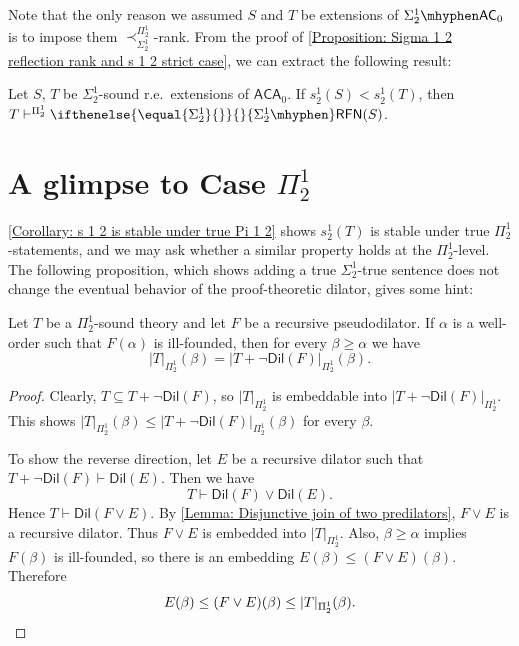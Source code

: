 \documentclass{mhkr}
\newcommand{\added}[1]{#1}
\newcommand{\Dil}{\mathsf{Dil}}
\newcommand{\RFN}[1][]{\ifthenelse{\equal{#1}{}}{}{#1\mhyphen}\mathsf{RFN}}
\newcommand{\AC}{\mathsf{AC}}
\newcommand{\ACA}{\mathsf{ACA}}
\begin{document}
Note that the only reason we assumed $S$ and $T$ be extensions of $\Sigma^1_2\mhyphen\AC_0$ is to impose them $\prec^{\Pi^1_2}_{\Sigma^1_2}$-rank. From the proof of \autoref{Proposition: Sigma 1 2 reflection rank and s 1 2 strict case}, we can extract the following result:
\begin{corollary} \label{Corollary: s 1 2 comparison and Sigma 1 2 reflection}
    \pushQED{\qed}
    Let $S$, $T$ be $\Sigma^1_2$-sound r.e.\ extensions of $\ACA_0$.
    If $s^1_2(S)< s^1_2(T)$, then $T \vdash^{\Pi^1_2}\RFN[\Sigma^1_2](S)$. \qedhere 
\end{corollary}


\section{A glimpse to Case \texorpdfstring{$\Pi^1_2$}{Pi 1 2}}
\label{Section: Pi 1 2 case}

\autoref{Corollary: s 1 2 is stable under true Pi 1 2} shows $s^1_2(T)$ is stable under true $\Pi^1_2$-statements, and we may ask \added{whether} a similar property holds at \added{the} $\Pi^1_2$-level. The following proposition, which shows adding a true $\Sigma^1_2$-true sentence does not change the eventual behavior of the proof-theoretic dilator, gives some hint:
\begin{proposition} \label{Proposition: True Sigma 1 2 does not change the eventual value of dilator}
    Let $T$ be a $\Pi^1_2$-sound theory and let $F$ be a recursive pseudodilator. If $\alpha$ is a well-order such that $F(\alpha)$ is ill-founded, then for every $\beta\ge\alpha$ we have
    \begin{equation*}
        |T|_{\Pi^1_2}(\beta) = |T+\lnot\Dil(F)|_{\Pi^1_2}(\beta).
    \end{equation*}
\end{proposition}
\begin{proof}
    Clearly, $T\subseteq T+\lnot\Dil(F)$, so $|T|_{\Pi^1_2}$ is embeddable into $|T+\lnot\Dil(F)|_{\Pi^1_2}$. This shows $|T|_{\Pi^1_2}(\beta)\le |T+\lnot\Dil(F)|_{\Pi^1_2}(\beta)$ for every $\beta$.

    To show the reverse direction, let $E$ be a recursive dilator such that $T + \lnot\Dil(F)\vdash \Dil(E)$. Then we have
    \begin{equation*}
        T \vdash \Dil(F)\lor \Dil(E).
    \end{equation*}
    Hence $T \vdash \Dil(F\lor E)$. By \autoref{Lemma: Disjunctive join of two predilators}, $F\lor E$ is a recursive dilator. Thus $F\lor E$ is embedded into $|T|_{\Pi^1_2}$. Also, $\beta\ge\alpha$ implies $F(\beta)$ is ill-founded, so there is an embedding $E(\beta)\le (F\lor E)(\beta)$. Therefore
    \begin{equation*}
        E(\beta)\le (F\lor E)(\beta)\le |T|_{\Pi^1_2}(\beta). \qedhere 
    \end{equation*}
\end{proof}
\end{document}
